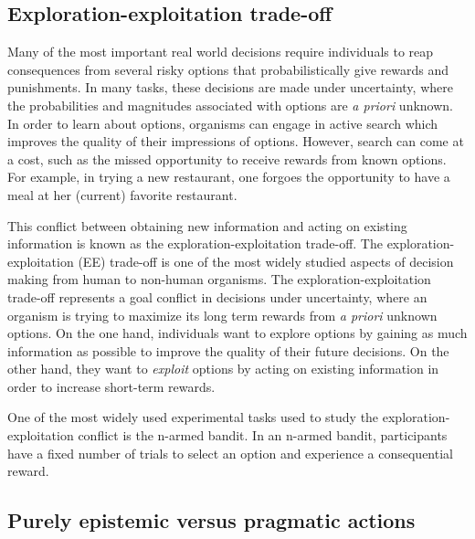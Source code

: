 \documentclass[a4paper,doc,natbib,floatsintext]{apa6}\usepackage[]{graphicx}\usepackage[]{color}
\begin{document}
\subsection{Exploration-exploitation trade-off}

Many of the most important real world decisions require individuals to reap consequences from several risky options that probabilistically give rewards and punishments. In many tasks, these decisions are made under uncertainty, where the probabilities and magnitudes associated with options are \textit{a priori} unknown. In order to learn about options, organisms can engage in active search which improves the quality of their impressions of options. However, search can come at a cost, such as the missed opportunity to receive rewards from known options. For example, in trying a new restaurant, one forgoes the opportunity to have a meal at her (current) favorite restaurant.

This conflict between obtaining new information and acting on existing information is known as the exploration-exploitation trade-off. The exploration-exploitation (EE) trade-off is one of the most widely studied aspects of decision making from human to non-human organisms. The exploration-exploitation trade-off represents a goal conflict in decisions under uncertainty, where an organism is trying to maximize its long term rewards from \textit{a priori} unknown options. On the one hand, individuals want to explore options by gaining as much information as possible to improve the quality of their future decisions. On the other hand, they want to \textit{exploit} options by acting on existing information in order to increase short-term rewards.

One of the most widely used experimental tasks used to study the exploration-exploitation conflict is the n-armed bandit. In an n-armed bandit, participants have a fixed number of trials to select an option and experience a consequential reward.


\subsection{Purely epistemic versus pragmatic actions}
\end{document}
